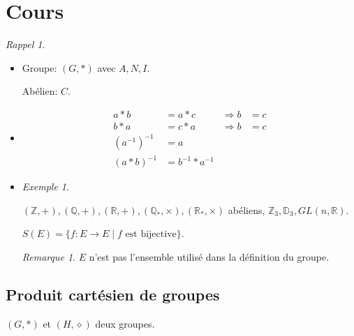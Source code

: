\documentclass{report}
\newcounter{cours}
\newcommand*{\cours}{\section*{Cours \thecours}\stepcounter{cours}}
\newcommand*{\reels}{\mathbb{R}}
\newcommand*{\entiers}{\mathbb{Z}}
\newcommand*{\rationels}{\mathbb{Q}}
\theoremstyle{definition}
\theoremstyle{remark}
\newtheorem*{exem}{Exemple}
\newtheorem*{rema}{Remarque}
\newtheorem*{rappel}{Rappel}
\begin{document}
	\cours
	\begin{rappel}~

		\begin{itemize}
			\item Groupe: $(G, *)$ avec $A, N, I$.

			Ab\'elien: $C$.
			\item
			\begin{align*}
				a*b&=a*c&\Rightarrow b&=c\\
				b*a&=c*a&\Rightarrow b&=c\\
				(a^{-1})^{-1}&= a\\
				(a*b)^{-1}&= b^{-1}*a^{-1}
			\end{align*}
			\item
			\begin{exem}~

				$(\entiers, +), (\rationels, +), (\reels, +), (\rationels_*, \times), (\reels_*, \times)$ ab\'eliens, $\entiers_3, \mathbb{D}_3, GL(n, \reels)$.

				$S(E)=\{f:E \to E \mid f\text{ est bijective}\}$.
				\begin{rema}
					$E$ n'est pas l'ensemble utilis\'e dans la d\'efinition du groupe.
				\end{rema}
			\end{exem}
		\end{itemize}
	\end{rappel}
	\subsection{Produit cart\'esien de groupes}
	$(G, *)$ et $(H, \diamond)$ deux groupes.
\end{document}
